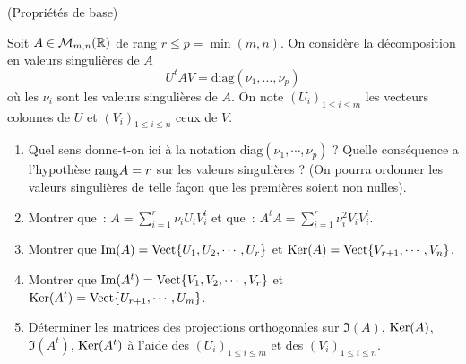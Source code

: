\documentclass[a4paper,12pt,reqno]{amsart}
\begin{document}


\begin{exo} (Propriétés de base)

    Soit $A\in{\mathcal M}_{m,n}(\mathbb{R})$ de rang $r\leq p=\min (m,n)$. On considère la décomposition en valeurs singulières de $A$
    $$
        U^tAV = \mbox{diag} (\nu_1, \ldots , \nu_p )
    $$
    où les $\nu_i$ sont les valeurs singulières de $A$. On note $(U_i)_{1\leq i\leq m}$ les vecteurs colonnes de $U$ et $(V_i)_{1\leq i\leq n}$ ceux de $V$.

    \begin{enumerate}
        \item Quel sens donne-t-on ici à la notation $\mbox{diag} (\nu_1, \cdots , \nu_p )$ ? Quelle conséquence a l'hypothèse ${\rm rang} A=r$ sur les valeurs singulières ? (On pourra ordonner les valeurs singulières de telle façon que les premières soient non nulles).

        \item Montrer que~:
        $
            A=\displaystyle\sum_{i=1}^r \nu_i U_i V_i^t
        $
        et que~:
        $
            A^t A= \displaystyle\sum_{i=1}^r \nu_i^2 V_i V_i^t.
        $

        \item Montrer que $\operatorname{Im}(A)=\operatorname{Vect}\{U_1, U_2, \cdots , U_r\}$ et $\operatorname{Ker}(A)=\operatorname{Vect}\{V_{r+1}, \cdots , V_n\}$.

        \item  Montrer que $\operatorname{Im}(A^t)=\operatorname{Vect}\{V_1, V_2, \cdots , V_r\}$ et
        $\operatorname{Ker}(A^t)=\operatorname{Vect}\{U_{r+1}, \cdots , U_m\}$.

        \item Déterminer les matrices des projections orthogonales sur $\Im(A)$, $\operatorname{Ker}(A)$, $\Im(A^t)$, $\operatorname{Ker}(A^t)$ à l'aide des $(U_i)_{1\leq i\leq m}$ et des $(V_i)_{1\leq i\leq n}$.
    \end{enumerate}
\end{exo}
\end{document}
